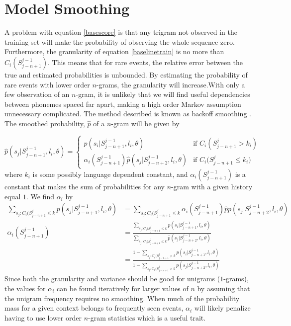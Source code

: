 \section{Model Smoothing}
\label{sect:basesmooth}

A problem with equation \ref{basescore} is that any trigram not observed in the training set will make the probability of observing the whole sequence zero.  Furthermore, the granularity of equation \ref{baselinetrain} is no more than $C_i(S_{j-n+1}^{j-1})$. This means that for rare events, the relative error between the true and estimated probabilities is unbounded. By estimating the probability of rare events with lower order $n$-grams, the granularity will increase.With only a few observation of an $n$-gram, it is unlikely that we will find useful dependencies between phonemes spaced far apart, making a high order Markov assumption unnecessary complicated. The method described is known as backoff smoothing \cite[p. 559]{talegk}. The smoothed probability, $\hat{p}$ of a $n$-gram will be given by

\begin{equation}
\label{basesmooth}
\hat{p}(s_j|S_{j-n+1}^{j-1}, l_i, \theta) = 
\begin{cases}
p(s_i|S_{j-n+1}^{j-1}, l_i, \theta) & \text{if $C_i(S_{j-n+1}^j > k_i)$} \\
\alpha_i(S_{j-n+1}^{j-1})\hat{p}(s_j|S_{j-n+2}^{j-1}, l_i, \theta) & \text{if $C_i(S_{j-n+1}^j \leq k_i$)}
\end{cases}
\end{equation}
where $k_i$ is some possibly language dependent constant, and $\alpha_i(S_{j-n+1}^{j-1})$ is a constant that makes the sum of probabilities for any $n$-gram with a given history equal $1$. We find $\alpha_i$ by 
\begin{align}
\sum_{s_j:C_i(S_{j-n+1}^j \leq k} p(s_j | S_{j-n+1}^{j-1}, l_i, \theta)
&= \sum_{s_j:C_i(S_{j-n+1}^j \leq k} \alpha_i(S_{j-n+1}^{j-1})\hat{p}p(s_j | S_{j-n+2}^{j-1}, l_i, \theta) \nonumber \\
\alpha_i(S_{j-n+1}^{j-1})
&= \frac{\sum_{s_j:C_i(S_{j-n+1}^j \leq k}p(s_i|S_{j-n+1}^{j-1}, l_i, \theta)}{\sum_{s_j:C_i(S_{j-n+1}^j \leq k}\hat{p}(s_j | S_{j-n+2}^{j-1}, l_i, \theta)} \nonumber \\
&=\frac{1-\sum_{s_j:C_i(S_{j-n+1}^j > k}p(s_i|S_{j-n+1}^{j-1}, l_i, \theta)}{1-\sum_{s_j:C_i(S_{j-n+1}^j > k}p(s_j | S_{j-n+2}^{j-1}, l_i, \theta)}
\end{align}
Since both the granularity and variance should be good for unigrams ($1$-grams), the values for $\alpha_i$ can be found iteratively for larger values of $n$ by assuming that the unigram frequency requires no smoothing. When much of the probability mass for a given context belongs to frequently seen events, $\alpha_i$ will likely penalize having to use lower order $n$-gram statistics which is a useful trait. 

